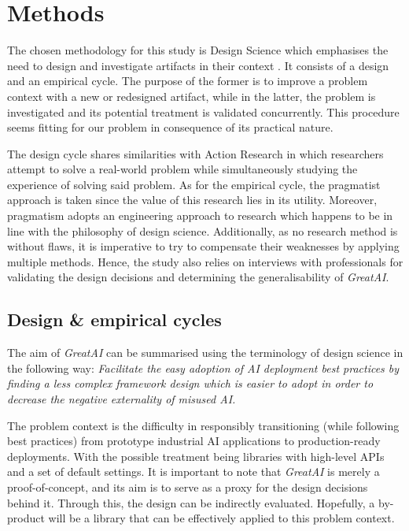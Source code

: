 \chapter{Methods} \label{chapter:methods}

The chosen methodology for this study is Design Science which emphasises the need to design and investigate artifacts in their context \cite{wieringa2014design}. It consists of a design and an empirical cycle. The purpose of the former is to improve a problem context with a new or redesigned artifact, while in the latter, the problem is investigated and its potential treatment is validated concurrently. This procedure seems fitting for our problem in consequence of its practical nature.

The design cycle shares similarities with Action Research \cite{davison2004principles} in which researchers attempt to solve a real-world problem while simultaneously studying the experience of solving said problem. As for the empirical cycle, the pragmatist approach is taken since the value of this research lies in its utility. Moreover, pragmatism adopts an engineering approach to research \cite{shull2007guide} which happens to be in line with the philosophy of design science. Additionally, as no research method is without flaws, it is imperative to try to compensate their weaknesses by applying multiple methods. Hence, the study also relies on interviews with professionals for validating the design decisions and determining the generalisability of \textit{GreatAI}.

\section{Design \& empirical cycles}

The aim of \textit{GreatAI} can be summarised using the terminology of design science in the following way: 
\textit{Facilitate the easy adoption of AI deployment best practices
by finding a less complex framework design 
which is easier to adopt
in order to decrease the negative externality of misused AI.}

The problem context is the difficulty in responsibly transitioning (while following best practices) from prototype industrial AI applications to production-ready deployments. With the possible treatment being libraries with high-level APIs and a set of default settings. It is important to note that \textit{GreatAI} is merely a proof-of-concept, and its aim is to serve as a proxy for the design decisions behind it. Through this, the design can be indirectly evaluated. Hopefully, a by-product will be a library that can be effectively applied to this problem context.

